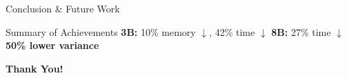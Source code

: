 \begin{frame}{Conclusion \& Future Work}

\begin{alertblock}{Summary of Achievements}
\small
\textbf{3B:} 10\% memory $\downarrow$, 42\% time $\downarrow$ \quad \textbf{8B:} 27\% time $\downarrow$ \quad \textbf{50\% lower variance}
\end{alertblock}

\vspace{0.2cm}


\vspace{0.5cm}

\begin{center}
\Large \textbf{Thank You!}\\
\end{center}

\end{frame}
